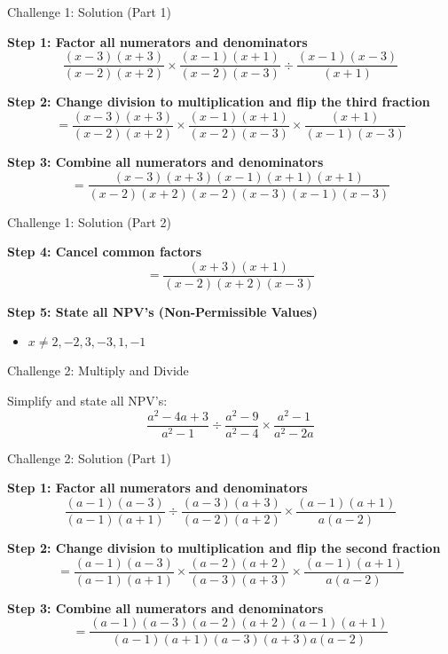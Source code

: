 \documentclass[aspectratio=169]{beamer}
\begin{document}
\begin{frame}{Challenge 1: Solution (Part 1)}
\begin{tcolorbox}[colback=lightgray,colframe=accent,title=Step-by-Step Solution (Part 1)]
\footnotesize
\textbf{Step 1: Factor all numerators and denominators}
\[
\frac{(x-3)(x+3)}{(x-2)(x+2)} \times \frac{(x-1)(x+1)}{(x-2)(x-3)} \div \frac{(x-1)(x-3)}{(x+1)}
\]

\textbf{Step 2: Change division to multiplication and flip the third fraction}
\[
= \frac{(x-3)(x+3)}{(x-2)(x+2)} \times \frac{(x-1)(x+1)}{(x-2)(x-3)} \times \frac{(x+1)}{(x-1)(x-3)}
\]

\textbf{Step 3: Combine all numerators and denominators}
\[
= \frac{(x-3)(x+3)(x-1)(x+1)(x+1)}{(x-2)(x+2)(x-2)(x-3)(x-1)(x-3)}
\]
\end{tcolorbox}
\end{frame}

\begin{frame}{Challenge 1: Solution (Part 2)}
\begin{tcolorbox}[colback=lightgray,colframe=accent,title=Step-by-Step Solution (Part 2)]
\footnotesize
\textbf{Step 4: Cancel common factors}
\[
= \frac{(x+3)(x+1)}{(x-2)(x+2)(x-3)}
\]

\textbf{Step 5: State all NPV's (Non-Permissible Values)}
\begin{itemize}
  \item $x \neq 2, -2, 3, -3, 1, -1$
\end{itemize}
\end{tcolorbox}
\end{frame}

\begin{frame}{Challenge 2: Multiply and Divide}
\begin{tcolorbox}[colback=lightgray,colframe=primary,title=Challenge 2]
\footnotesize
Simplify and state all NPV's:
\[
\frac{a^2-4a+3}{a^2-1} \div \frac{a^2-9}{a^2-4} \times \frac{a^2-1}{a^2-2a}
\]
\end{tcolorbox}
\end{frame}

\begin{frame}{Challenge 2: Solution (Part 1)}
\begin{tcolorbox}[colback=lightgray,colframe=accent,title=Step-by-Step Solution (Part 1)]
\footnotesize
\textbf{Step 1: Factor all numerators and denominators}
\[
\frac{(a-1)(a-3)}{(a-1)(a+1)} \div \frac{(a-3)(a+3)}{(a-2)(a+2)} \times \frac{(a-1)(a+1)}{a(a-2)}
\]

\textbf{Step 2: Change division to multiplication and flip the second fraction}
\[
= \frac{(a-1)(a-3)}{(a-1)(a+1)} \times \frac{(a-2)(a+2)}{(a-3)(a+3)} \times \frac{(a-1)(a+1)}{a(a-2)}
\]

\textbf{Step 3: Combine all numerators and denominators}
\[
= \frac{(a-1)(a-3)(a-2)(a+2)(a-1)(a+1)}{(a-1)(a+1)(a-3)(a+3)a(a-2)}
\]
\end{tcolorbox}
\end{frame}
\end{document}
